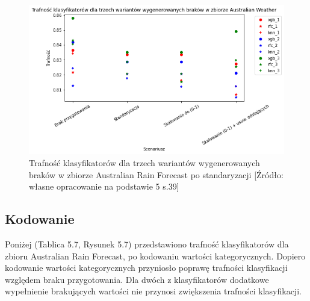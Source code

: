 \documentclass[oneside]{book}
\begin{document}
    \begin{figure}[H]
        \centerline{\includegraphics[scale=0.8]{Aus_Weather_Standaryzacja}}
        \centering
        \caption{Trafność klasyfikatorów dla 
        trzech wariantów wygenerowanych braków 
        w zbiorze Australian Rain Forecast 
        po standaryzacji
        [Źródło: własne opracowanie na podstawie 5 s.39]}
        \end{figure}



\subsection{Kodowanie}

Poniżej (Tablica 5.7, Rysunek 5.7) przedstawiono 
trafność klasyfikatorów dla zbioru Australian Rain Forecast, 
po kodowaniu wartości kategorycznych.
Dopiero kodowanie wartości kategorycznych przyniosło poprawę 
trafności klasyfikacji względem braku przygotowania.
Dla dwóch z klasyfikatorów dodatkowe wypełnienie brakujących wartości 
nie przynosi zwiększenia trafności klasyfikacji.
\end{document}
